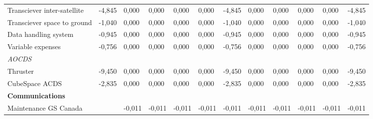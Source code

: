 \begin{landscape}
\begin{table}[]
{\begin{tabular}{| l |l|l|l|l|l|l|l|l|l|l|l|}
Transciever inter-satellite                                                            & -4,845  & 0,000          & 0,000          & 0,000          & 0,000          & -4,845         & 0,000          & 0,000          & 0,000          & 0,000          & -4,845         \\
Transciever space to ground                                                            & -1,040  & 0,000          & 0,000          & 0,000          & 0,000          & -1,040         & 0,000          & 0,000          & 0,000          & 0,000          & -1,040         \\ 
Data handling system                                                                   & -0,945  & 0,000          & 0,000          & 0,000          & 0,000          & -0,945         & 0,000          & 0,000          & 0,000          & 0,000          & -0,945         \\
Variable expenses                                                                      & -0,756  & 0,000          & 0,000          & 0,000          & 0,000          & -0,756         & 0,000          & 0,000          & 0,000          & 0,000          & -0,756         \\
\textit{AOCDS}                                                                         &         &                &                &                &                &                &                &                &                &                &                \\
Thruster                                                                               & -9,450  & 0,000          & 0,000          & 0,000          & 0,000          & -9,450         & 0,000          & 0,000          & 0,000          & 0,000          & -9,450         \\
CubeSpace ACDS                                                                         & -2,835  & 0,000          & 0,000          & 0,000          & 0,000          & -2,835         & 0,000          & 0,000          & 0,000          & 0,000          & -2,835         \\
\textbf{Communications}                                                                &         &                &                &                &                &                &                &                &                &                &                \\
Maintenance GS Canada                                                                  &         & -0,011         & -0,011         & -0,011         & -0,011         & -0,011         & -0,011         & -0,011         & -0,011         & -0,011         & -0,011         \\

\end{tabular}}
\end{table}
\end{landscape}
